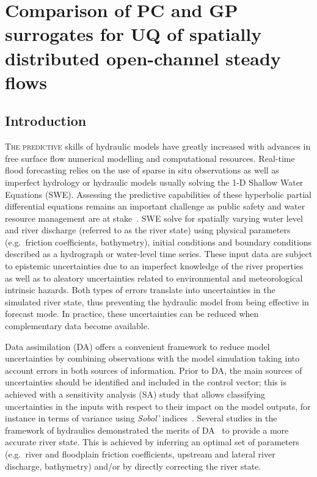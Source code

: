 \chapter{Comparison of PC and GP surrogates for UQ of spatially distributed open-channel steady flows}\label{chap:mascaret}

\section{Introduction}

\lettrine{T}{he predictive} skills of hydraulic models have greatly increased with advances in free surface flow numerical modelling and computational resources. Real-time flood forecasting relies on the use of sparse in situ observations as well as imperfect hydrology or hydraulic models usually solving the 1-D Shallow Water Equations (SWE). Assessing the predictive capabilities of these hyperbolic partial differential equations remains an important challenge as public safety and water resource management are at stake~\citep{weerts2011}. SWE solve for spatially varying water level and river discharge (referred to as the river state) using physical parameters (e.g.~friction coefficients, bathymetry), initial conditions and boundary conditions described as a hydrograph or water-level time series. These input data are subject to epistemic uncertainties due to an imperfect knowledge of the river properties as well as to aleatory uncertainties related to environmental and meteorological intrinsic hazards. Both types of errors translate into uncertainties in the simulated river state, thus preventing the hydraulic model from being effective in forecast mode. In practice, these uncertainties can be reduced when complementary data become available.

Data assimilation (DA) offers a convenient framework to reduce model uncertainties by combining observations with the model simulation taking into account errors in both sources of information. Prior to DA, the main sources of uncertainties should be identified and included in the control vector; this is achieved with a sensitivity analysis (SA) study that allows classifying uncertainties in the inputs with respect to their impact on the model outputs, for instance in terms of variance using \emph{Sobol'} indices~\citep{iooss2016}. Several studies in the framework of hydraulics demonstrated the merits of DA~\citep{barthelemy2015,cloke2009,dechant2011,habert2016,moradkhani2005} to provide a more accurate river state.
This is achieved by inferring an optimal set of parameters (e.g.~river and floodplain friction coefficients, upstream and lateral river discharge, bathymetry) and/or by directly correcting the river state.


